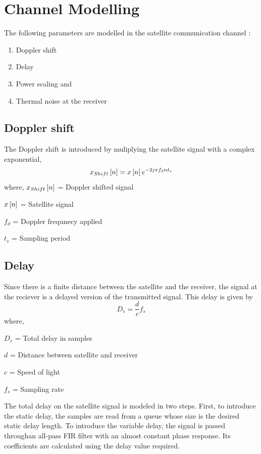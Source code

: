 \documentclass[conference]{IEEEtran}
\begin{document}
\section{Channel Modelling}
The following parameters are modelled in the satellite communication channel \cite{b7}:
\begin{enumerate}
   \item Doppler shift
   \item Delay 
   \item Power scaling and 
   \item Thermal noise at the receiver
\end{enumerate}
\subsection{Doppler shift}

The Doppler shift is introduced by muliplying the satellite signal with a complex exponential,
\begin{equation}
    x_{Shift}{}\left[n\right] = x{}\left[n\right]e^{-2j\pi f_d n t_s}
\end{equation}
where,
$x_{Shift}{}\left[n\right]$ = Doppler shifted signal

$x{}\left[n\right]$ = Satellite signal

$f_d$ = Doppler frequnecy applied

$t_{s}$ = Sampling period
\subsection{Delay}
Since there is a finite distance between the satellite and the receiver, the signal at the reciever is a delayed version of the transmitted signal. This delay is given by
\begin{equation}
    D_{s} = \frac{d}{c}f_{s} 
\end{equation}
where,

$D_{s}$ = Total delay in samples

$d$ = Distance between satellite and receiver

$c$ = Speed of light

$f_{s}$ = Sampling rate

The total delay on the satellite signal is modeled in two steps. First, to introduce the static delay,
the samples are read from a queue whose size is the desired static delay length. To introduce the 
variable delay, the signal is passed throughan all-pass FIR filter with an almost constant phase 
response. Its coefficients are calculated using the delay value required.
\end{document}
